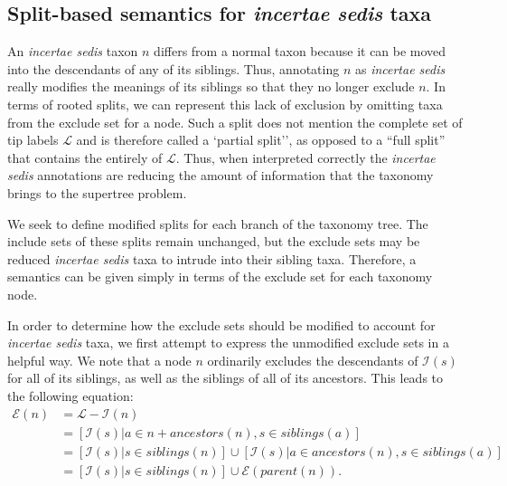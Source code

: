 \documentclass[english]{article}
\begin{document}
\subsection{Split-based semantics for \emph{incertae sedis} taxa}

An \emph{incertae sedis} taxon $n$ differs from a normal taxon because it can be
moved into the descendants of any of its siblings.  Thus, annotating $n$ as
\emph{incertae sedis} really modifies the meanings of its siblings so that they
no longer exclude $n$.  In terms of rooted splits, we can represent this lack of
exclusion by omitting taxa from the exclude set for a node.  Such a split does
not mention the complete set of tip labels $\mathcal{L}$ and is therefore called a
`partial split'', as opposed to a ``full split'' that contains the entirely of $\mathcal{L}$.
Thus, when interpreted correctly the \emph{incertae sedis} 
annotations are reducing the amount of information that the taxonomy brings to
the supertree problem.

We seek to define modified splits for each branch of the taxonomy tree. The
include sets of these splits remain unchanged, but the exclude sets may be reduced
\emph{incertae sedis} taxa to intrude into their sibling taxa.  Therefore, a
semantics can be given simply in terms of the exclude set for each taxonomy node.

In order to determine how the exclude sets should be modified to account for
\emph{incertae sedis} taxa, we first attempt to express the unmodified exclude
sets in a helpful way.  We note that a node $n$ ordinarily excludes the
descendants of $\mathcal{I}(s)$ for all of its siblings, as well as the siblings
of all of its ancestors.  This leads to the following equation:
\begin{align}
\mathcal{E}(n) & = \mathcal{L} - \mathcal{I}(n)\nonumber\\
 & =\left[\mathcal{I}(s)\big|a\in n+ancestors(n),s\in siblings(a)\right]\nonumber\\
 & =\left[\mathcal{I}(s)\big|s\in siblings(n)\right]\cup\left[\mathcal{I}(s)\big|a\in ancestors(n),s\in siblings(a)\right]\nonumber\\
 & =\left[\mathcal{I}(s)\big|s\in siblings(n)\right]\cup\mathcal{E}(parent(n)).\label{eq:exsetformonea-traditional}
\end{align}
\end{document}
